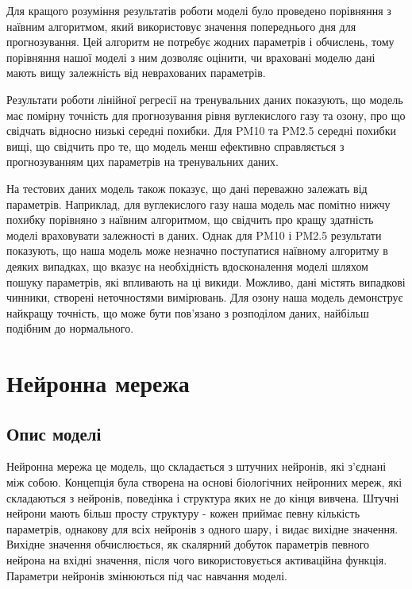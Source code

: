 Для кращого розуміння результатів роботи моделі було проведено порівняння з наївним алгоритмом, який використовує значення попереднього дня для прогнозування. 
Цей алгоритм не потребує жодних параметрів і обчислень, тому порівняння нашої моделі з ним дозволяє оцінити, чи враховані моделю дані мають вищу залежність від неврахованих параметрів.

Результати роботи лінійної регресії на тренувальних даних показують, що модель має помірну точність для прогнозування рівня вуглекислого газу та озону, про що свідчать відносно низькі середні похибки. 
Для PM10 та PM2.5 середні похибки вищі, що свідчить про те, що модель менш ефективно справляється з прогнозуванням цих параметрів на тренувальних даних.

На тестових даних модель також показує, що дані переважно залежать від параметрів. 
Наприклад, для вуглекислого газу наша модель має помітно нижчу похибку порівняно з наївним алгоритмом, що свідчить про кращу здатність моделі враховувати залежності в даних. 
Однак для PM10 і PM2.5 результати показують, що наша модель може незначно поступатися наївному алгоритму в деяких випадках, що вказує на необхідність вдосконалення моделі шляхом пошуку параметрів, які впливають на ці викиди. 
Можливо, дані містять випадкові чинники, створені неточностями вимірювань. 
Для озону наша модель демонструє найкращу точність, що може бути пов’язано з розподілом даних, найбільш подібним до нормального.

\section{Нейронна мережа}

\subsection{Опис моделі}

Нейронна мережа це модель, що складається з штучних нейронів, які з'єднані між собою. 
Концепція була створена на основі біологічних нейронних мереж, які складаються з нейронів, поведінка і структура яких не до кінця вивчена. 
Штучні нейрони мають більш просту структуру - кожен приймає певну кількість параметрів, однакову для всіх нейронів з одного шару, і видає вихідне значення. 
Вихідне значення обчислюється, як скалярний добуток параметрів певного нейрона на вхідні значення, після чого використовується активаційна функція. 
Параметри нейронів змінюються під час навчання моделі. 

